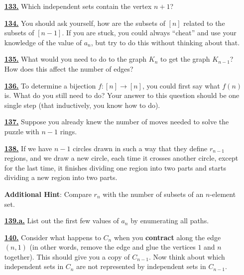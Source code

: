 \documentclass[10pt,]{book}
\newcommand{\terminology}[1]{\textbf{#1}}
\theoremstyle{plain}
\theoremstyle{definition}
\theoremstyle{definition}
\theoremstyle{definition}
\numberwithin{equation}{chapter}
\begin{document}
\begin{itemize}[itemsep=1em]
\hypertarget{a-133}{}\item[\textbf{\hyperref[activity-126]{133.}}]
\hypertarget{p-892}{}%
Which independent sets contain the vertex \(n+1\)?%

\hypertarget{a-134}{}\item[\textbf{\hyperref[activity-127]{134.}}]
\hypertarget{p-896}{}%
You should ask yourself, how are the subsets of \([n]\) related to the subsets of \([n-1]\).  If you are stuck, you could always ``cheat'' and use your knowledge of the value of \(a_n\), but try to do this without thinking about that.%

\hypertarget{a-135}{}\item[\textbf{\hyperref[activity-128]{135.}}]
\hypertarget{p-898}{}%
What would you need to do to the graph \(K_n\) to get the graph \(K_{n-1}\)?  How does this affect the number of edges?%

\hypertarget{a-136}{}\item[\textbf{\hyperref[activity-129]{136.}}]
\hypertarget{p-900}{}%
To determine a bijection \(f:[n] \to [n]\), you could first say what \(f(n)\) is.  What do you still need to do?  Your answer to this question should be one single step (that inductively, you know how to do).%

\hypertarget{a-137}{}\item[\textbf{\hyperref[HanoiProblem]{137.}}]
\hypertarget{p-902}{}%
Suppose you already knew the number of moves needed to solve the puzzle with \(n-1\) rings.%

\hypertarget{a-138}{}\item[\textbf{\hyperref[circlesinplane]{138.}}]
\hypertarget{p-905}{}%
If we have \(n - 1\) circles drawn in such a way that they define \(r_{n-1}\) regions, and we draw a new circle, each time it crosses another circle, except for the last time, it finishes dividing one region into two parts and starts dividing a new region into two parts.%

\par\smallskip
\noindent\textbf{Additional Hint}: \hypertarget{p-906}{}%
Compare \(r_n\) with the number of subsets of an \(n\)-element set.%

\hypertarget{a-139.a}{}\item[\textbf{\hyperref[task-173]{139.a.}}]
\hypertarget{p-912}{}%
List out the first few values of \(a_n\) by enumerating all paths.%

\hypertarget{a-140}{}\item[\textbf{\hyperref[activity-133]{140.}}]
\hypertarget{p-915}{}%
Consider what happens to \(C_n\) when you \terminology{contract} along the edge \((n,1)\) (in other words, remove the edge and glue the vertices \(1\) and \(n\) together).  This should give you a copy of \(C_{n-1}\).  Now think about which independent sets in \(C_n\) are not represented by independent sets in \(C_{n-1}\).%


\end{itemize}
\end{document}
